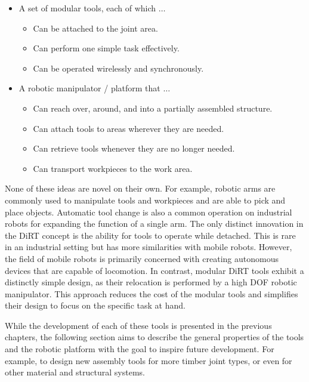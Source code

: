\begin{itemize}
	\item A set of modular tools, each of which $\ldots$

\begin{itemize}
	\item Can be attached to the joint area.

	\item Can perform one simple task effectively.

	\item Can be operated wirelessly and synchronously.

\end{itemize}
	\item A robotic manipulator / platform that $\ldots$ 

\begin{itemize}
	\item Can reach over, around, and into a partially assembled structure.

	\item Can attach tools to areas wherever they are needed.

	\item Can retrieve tools whenever they are no longer needed.

	\item Can transport workpieces to the work area.

\end{itemize}
\end{itemize}
None of these ideas are novel on their own. For example, robotic arms are commonly used to manipulate tools and workpieces and are able to pick and place objects. Automatic tool change is also a common operation on industrial robots for expanding the function of a single arm. The only distinct innovation in the DiRT concept is the ability for tools to operate while detached. This is rare in an industrial setting but has more similarities with mobile robots. However, the field of mobile robots is primarily concerned with creating autonomous devices that are capable of locomotion. In contrast, modular DiRT tools exhibit a distinctly simple design, as their relocation is performed by a high DOF robotic manipulator. This approach reduces the cost of the modular tools and simplifies their design to focus on the specific task at hand. 

While the development of each of these tools is presented in the previous chapters, the following section aims to describe the general properties of the tools and the robotic platform with the goal to inspire future development. For example, to design new assembly tools for more timber joint types, or even for other material and structural systems.

